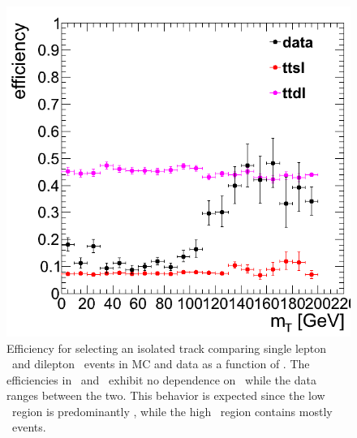 \begin{figure}[hbt]
  \begin{center}
	\includegraphics[width=0.5\linewidth]{plots/vetoeff_comp.png}
	\caption{
	  \label{fig:vetoeffcomp}%
          Efficiency for selecting an isolated track comparing
          single lepton \ttlj\ and dilepton \ttll\ events in MC and 
          data as a function of \mt. The
          efficiencies in \ttlj\ and \ttll\ exhibit no dependence on
          \mt\, while the data ranges between the two. This behavior
          is expected since the low \mt\ region is predominantly \ttlj, while the
          high \mt\ region contains mostly \ttll\ events.}  
      \end{center}
\end{figure}


